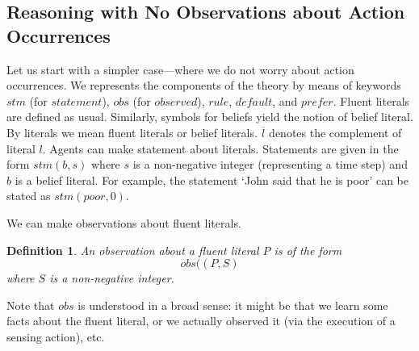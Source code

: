 \documentclass{article}
\newtheorem{definition}{Definition}
\def\naf{\: {not} \:}
\begin{document}
%
%


\subsection{Reasoning with No Observations about Action Occurrences}

Let us start with a simpler case---where we do not worry about action
occurrences. We represents the components of the theory by means of keywords 
$stm$ (for $statement$), $obs$ (for $observed$), $rule$, $default$, and $prefer$. 
Fluent literals are defined as usual. Similarly, symbols for beliefs yield the notion of belief literal. By literals we mean fluent literals or belief literals. $\overline{l}$ 
denotes the complement of literal $l$. Agents can make statement about literals.  
Statements are given in the form {$stm(b,s)$}
where  $s$ is a non-negative integer (representing a time step) and $b$ is a belief literal.  
For example, the statement `John said that he is poor'  can be stated as 
$stm(poor, 0)$. 

%


\iffalse
We can make observations about fluent literals. 
\begin{definition} 
An observation about a fluent literal $P$ is of the form 
\begin{equation}\label{obs}
obs((P,   S)  
\end{equation} 
where  $S$ is a non-negative integer. 
\end{definition} 
Note that $obs$ is understood in a broad sense: it might be that we learn some facts about the fluent literal, or we actually observed it (via the execution of a sensing action), etc. 
\end{document}
